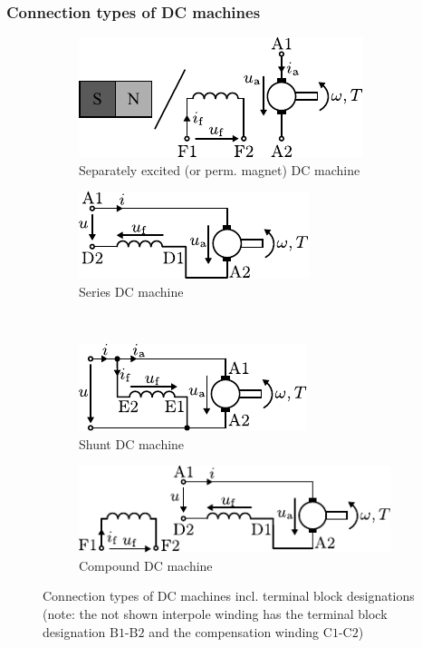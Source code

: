 \begin{frame}
	\frametitle{Connection types of DC machines}
	\vspace{-0.1cm}
	\begin{figure}
		\ContinuedFloat
		\centering
		\begin{subfigure}[b]{0.49\textwidth}
			\centering
			\includegraphics[scale=1.2]{fig/lec03/Separately_excited_DC_machine.pdf}
			\caption{Separately excited (or perm. magnet) DC machine} 
		\end{subfigure}
		\hfill
		\begin{subfigure}[b]{0.49\textwidth}
			\centering
			\includegraphics[scale=1.2]{fig/lec03/Series_DC_machine.pdf}
			\caption{Series DC machine} 
		\end{subfigure}
		\\
		\begin{subfigure}[b]{0.49\textwidth}
			\centering
			\includegraphics[scale=1.2]{fig/lec03/Shunt_DC_machine.pdf}
			\caption{Shunt DC machine} 
		\end{subfigure}
		\hfill
		\begin{subfigure}[b]{0.49\textwidth}
			\centering
			\includegraphics[scale=1.2]{fig/lec03/Compound_DC_machine.pdf}
			\caption{Compound DC machine} 
		\end{subfigure}
		\vspace{-0.1cm}
		\caption{Connection types of DC machines incl. terminal block designations (note: the not shown interpole winding has the terminal block designation $\mbox{B}1$-$\mbox{B}2$ and the compensation winding $\mbox{C}1$-$\mbox{C}2$)} 
        \label{fig:connection_types_DC_machines}
	\end{figure}
\end{frame}

